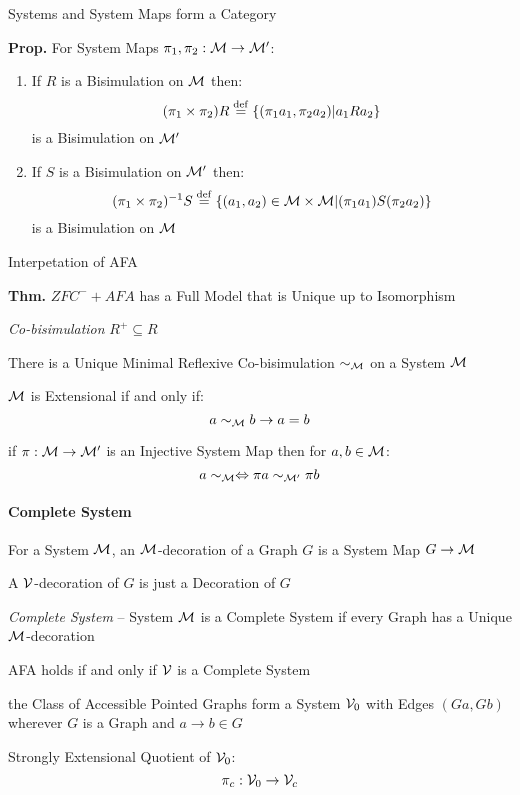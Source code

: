 Systems and System Maps form a Category %

\textbf{Prop.} For System Maps $\pi_1,\pi_2 : \mathcal{M} \to
\mathcal{M}'$:
\begin{enumerate}
  \item If $R$ is a Bisimulation on $\mathcal{M}$ then:
    \[
      (\pi_1 \times \pi_2) R
        \stackrel{\mathrm{def}}= \{(\pi_1 a_1, \pi_2 a_2) | a_1 R a_2\}
    \]
    is a Bisimulation on $\mathcal{M}'$
  \item If $S$ is a Bisimulation on $\mathcal{M}'$ then:
    \[
      (\pi_1 \times \pi_2)^{-1}S
        \stackrel{\mathrm{def}}= \{(a_1,a_2) \in \mathcal{M} \times \mathcal{M}
        | (\pi_1 a_1) S (\pi_2 a_2)\}
    \]
    is a Bisimulation on $\mathcal{M}$
\end{enumerate}

Interpetation of AFA %

\textbf{Thm.} $ZFC^- + AFA$ has a Full Model that is Unique up to
Isomorphism

\emph{Co-bisimulation} $R^+ \subseteq R$

There is a Unique Minimal Reflexive Co-bisimulation $\sim_\mathcal{M}$
on a System $\mathcal{M}$

$\mathcal{M}$ is Extensional if and only if:
\[
  a \sim_\mathcal{M} b \to a = b
\]

if $\pi : \mathcal{M} \to \mathcal{M}'$ is an Injective System Map
then for $a,b \in \mathcal{M}$:
\[
  a \sim_\mathcal{M} \Leftrightarrow \pi a \sim_{\mathcal{M}'} \pi b
\]



\paragraph{Complete System}\label{sec:complete_system}\hfill

For a System $\mathcal{M}$, an $\mathcal{M}$-decoration of a Graph $G$ is
a System Map $G \to \mathcal{M}$

A $\mathcal{V}$-decoration of $G$ is just a Decoration of $G$

\emph{Complete System} -- System $\mathcal{M}$ is a Complete System if
every Graph has a Unique $\mathcal{M}$-decoration

AFA holds if and only if $\mathcal{V}$ is a Complete System

the Class of Accessible Pointed Graphs form a System $\mathcal{V}_0$
with Edges $(G a, G b)$ wherever $G$ is a Graph and $a \to b
\in G$

Strongly Extensional Quotient of $\mathcal{V}_0$:
\[
  \pi_c : \mathcal{V}_0 \to \mathcal{V}_c
\]

